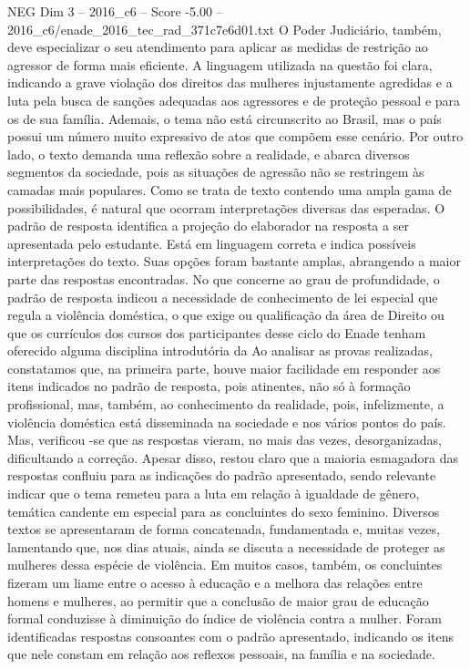 \begin{textsample}{NEG Dim 3 – 2016\_c6 – Score -5.00 – 2016\_c6/enade\_2016\_tec\_rad\_371c7e6d01.txt}
O Poder Judiciário, também, deve especializar o seu atendimento para aplicar as medidas de restrição ao agressor de forma mais eficiente.
A linguagem utilizada na questão foi clara, indicando a grave violação dos direitos das mulheres injustamente agredidas e a luta pela busca de sanções adequadas aos agressores e de proteção pessoal e para os de sua família.
Ademais, o tema não está circunscrito ao Brasil, mas o país possui um número muito expressivo de atos que compõem esse cenário.
Por outro lado, o texto demanda uma reflexão sobre a realidade, e abarca diversos segmentos da sociedade, pois as situações de agressão não se restringem às camadas mais populares.
Como se trata de texto contendo uma ampla gama de possibilidades, é natural que ocorram interpretações diversas das esperadas.
O padrão de resposta identifica a projeção do elaborador na resposta a ser apresentada pelo estudante.
Está em linguagem correta e indica possíveis interpretações do texto.
Suas opções foram bastante amplas, abrangendo a maior parte das respostas encontradas.
No que concerne ao grau de profundidade, o padrão de resposta indicou a necessidade de conhecimento de lei especial que regula a violência doméstica, o que exige ou qualificação da área de Direito ou que os currículos dos cursos dos participantes desse ciclo do Enade tenham oferecido alguma disciplina introdutória da Ao analisar as provas realizadas, constatamos que, na primeira parte, houve maior facilidade em responder aos itens indicados no padrão de resposta, pois atinentes, não só à formação profissional, mas, também, ao conhecimento da realidade, pois, infelizmente, a violência doméstica está disseminada na sociedade e nos vários pontos do país.
Mas, verificou -se que as respostas vieram, no mais das vezes, desorganizadas, dificultando a correção.
Apesar disso, restou claro que a maioria esmagadora das respostas confluiu para as indicações do padrão apresentado, sendo relevante indicar que o tema remeteu para a luta em relação à igualdade de gênero, temática candente em especial para as concluintes do sexo feminino.
Diversos textos se apresentaram de forma concatenada, fundamentada e, muitas vezes, lamentando que, nos dias atuais, ainda se discuta a necessidade de proteger as mulheres dessa espécie de violência.
Em muitos casos, também, os concluintes fizeram um liame entre o acesso à educação e a melhora das relações entre homens e mulheres, ao permitir que a conclusão de maior grau de educação formal conduzisse à diminuição do índice de violência contra a mulher.
Foram identificadas respostas consoantes com o padrão apresentado, indicando os itens que nele constam em relação aos reflexos pessoais, na família e na sociedade.

\end{textsample}
